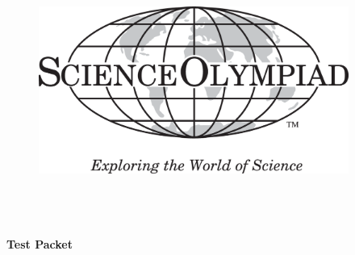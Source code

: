 \documentclass{scioly-exam-template-araneesh}
\newcommand{\printdoctype}{Test Packet}
\begin{document}
\begin{center}
\vspace*{1em}
{\Huge \textbf{
        \printtournament\\
        \printdate\\
        \vspace{4mm}
    }
}
\begin{figure}[h]
    \centering
    \includegraphics[width=4in,height=3in,keepaspectratio]{images/logo.png}
\end{figure}
{\Huge \textbf{
        \printevent\\
        \printdoctype\\
        \vspace{4mm}
    }
}
{\Large \textbf{\printauthor} \\ \vspace{4mm}}
\end{center}
\end{document}
